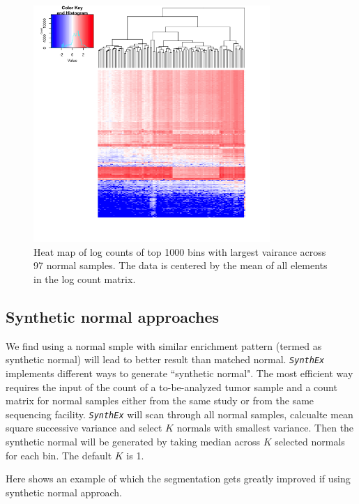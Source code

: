 \documentclass{article}
\newcommand{\pkg}[1]{\texttt{\textsl{#1}}}
\begin{document}
\begin{figure}
\begin{center}
\includegraphics[width=0.8\textwidth]{figure/heatmap2-1}
\end{center}
\caption{Heat map of log counts of top 1000 bins with largest vairance across 97 normal samples. The data is centered by the mean of all elements in the log count matrix.}
\label{heatmap2}
\end{figure}

\subsection{Synthetic normal approaches}
We find using a normal smple with similar enrichment pattern (termed as synthetic normal) will lead to better result than matched normal. \pkg{SynthEx} implements different ways to generate ``synthetic normal". The most efficient way requires the input of the count of a to-be-analyzed tumor sample and a count matrix for normal samples either from the same study or from the same sequencing facility. \pkg{SynthEx} will scan through all normal samples, calcualte mean square successive variance and select $K$ normals with smallest variance. Then the synthetic normal will be generated by taking median across $K$ selected normals for each bin. The default $K$ is 1.

Here shows an example of which the segmentation gets greatly improved if using synthetic normal approach.
\end{document}

